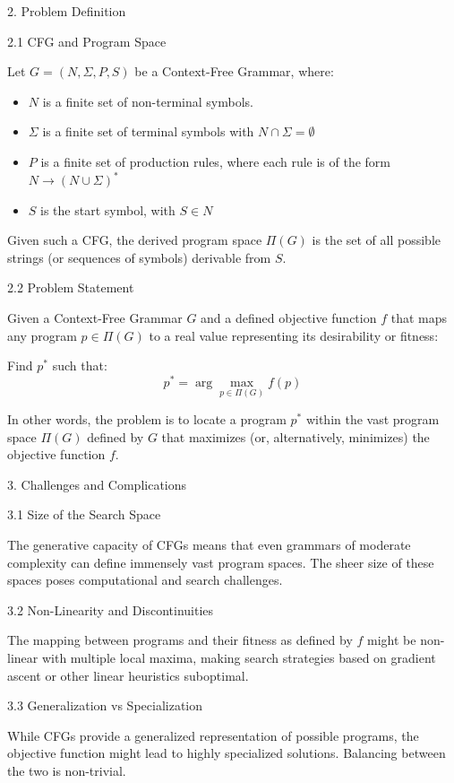 2. Problem Definition

2.1 CFG and Program Space

Let \( G = (N, \Sigma, P, S) \) be a Context-Free Grammar, where:
\begin{itemize}
    \item \( N \) is a finite set of non-terminal symbols.
    \item \( \Sigma \) is a finite set of terminal symbols with \newline \( N \cap \Sigma = \emptyset \)
    \item \( P \) is a finite set of production rules, where each rule is of the form \( N \rightarrow (N \cup \Sigma)^* \)
    \item \( S \) is the start symbol, with \( S \in N \)
\end{itemize}

Given such a CFG, the derived program space \( \Pi(G) \) is the set of all possible strings (or sequences of symbols) derivable from \( S \).

2.2 Problem Statement

Given a Context-Free Grammar \( G \) and a defined objective function \( f \) that maps any program \( p \in \Pi(G) \) to a real value representing its desirability or fitness:

Find \( p^* \) such that:
\[ p^* = \arg\max_{p \in \Pi(G)} f(p) \]

In other words, the problem is to locate a program \( p^* \) within the vast program space \( \Pi(G) \) defined by \( G \) that maximizes (or, alternatively, minimizes) the objective function \( f \).

3. Challenges and Complications

3.1 Size of the Search Space

The generative capacity of CFGs means that even grammars of moderate complexity can define immensely vast program spaces. The sheer size of these spaces poses computational and search challenges.

3.2 Non-Linearity and Discontinuities

The mapping between programs and their fitness as defined by \( f \) might be non-linear with multiple local maxima, making search strategies based on gradient ascent or other linear heuristics suboptimal.

3.3 Generalization vs Specialization

While CFGs provide a generalized representation of possible programs, the objective function might lead to highly specialized solutions. Balancing between the two is non-trivial.

